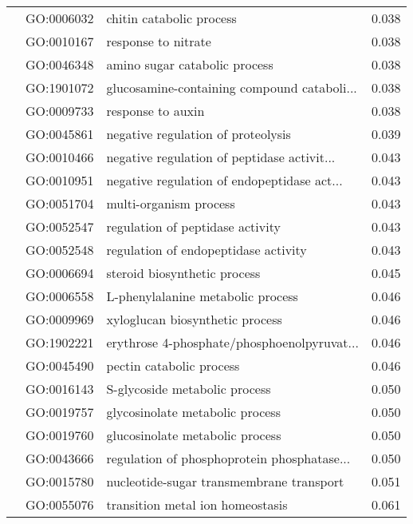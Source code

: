 \begin{longtable}{lllr}
   & GO:0006032 &                     chitin catabolic process &         0.038 \\
   & GO:0010167 &                          response to nitrate &         0.038 \\
   & GO:0046348 &                amino sugar catabolic process &         0.038 \\
   & GO:1901072 &  glucosamine-containing compound cataboli... &         0.038 \\
   & GO:0009733 &                            response to auxin &         0.038 \\
   & GO:0045861 &           negative regulation of proteolysis &         0.039 \\
   & GO:0010466 &  negative regulation of peptidase activit... &         0.043 \\
   & GO:0010951 &  negative regulation of endopeptidase act... &         0.043 \\
   & GO:0051704 &                       multi-organism process &         0.043 \\
   & GO:0052547 &             regulation of peptidase activity &         0.043 \\
   & GO:0052548 &         regulation of endopeptidase activity &         0.043 \\
   & GO:0006694 &                 steroid biosynthetic process &         0.045 \\
   & GO:0006558 &            L-phenylalanine metabolic process &         0.046 \\
   & GO:0009969 &              xyloglucan biosynthetic process &         0.046 \\
   & GO:1902221 &  erythrose 4-phosphate/phosphoenolpyruvat... &         0.046 \\
   & GO:0045490 &                     pectin catabolic process &         0.046 \\
   & GO:0016143 &                S-glycoside metabolic process &         0.050 \\
   & GO:0019757 &              glycosinolate metabolic process &         0.050 \\
   & GO:0019760 &              glucosinolate metabolic process &         0.050 \\
   & GO:0043666 &  regulation of phosphoprotein phosphatase... &         0.050 \\
   & GO:0015780 &     nucleotide-sugar transmembrane transport &         0.051 \\
   & GO:0055076 &             transition metal ion homeostasis &         0.061 \\

\end{longtable}
